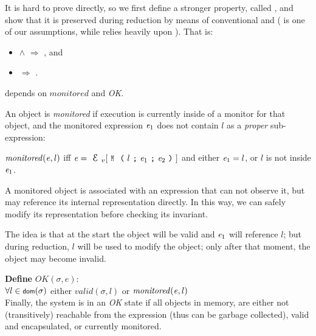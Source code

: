 It is hard to prove  directly,
so we first define a stronger property,
called , and
show that it is preserved during reduction by means of conventional
 and  ( is one of our assumptions,
while  relies heavily upon ).
That is:
\begin{itemize}
\item {} $\wedge$  $\Rightarrow$ , and
\item {} $\Rightarrow$ .
\end{itemize}


 depends on $\mathit{monitored}$ and \emph{OK}. 

An object is \emph{monitored} if execution
is currently inside of a monitor for that object, and
the monitored expression ${\mathit{e}}_1$ does not
contain $l$ as a \emph{proper} sub-expression:

\indent $\mathit{monitored}({\mathit{e}},l)$ iff
$\e=\ctx_v[\M{l}{\e_1}{\e_2}]$ and either ${\mathit{e}}_1=l$, or $l$ is not inside ${\mathit{e}}_1$.%

\noindent A monitored object is associated with an expression that can not observe it, but may
reference its internal representation directly.
In this way, we can safely modify its representation before checking its invariant.

The idea is that at the start the object will be valid and ${\mathit{e}}_1$ will reference $l$;
but during reduction, $l$ will be used to
modify the object; only after that moment, the object may become invalid.


\noindent\textbf{Define} $\mathit{OK}(\sigma,e)$:\\
\indent $\forall l\in\dom(\sigma)$
  either $\mathit{valid}(\sigma,l)$ or $\mathit{monitored}({\mathit{e}},l)$\\

\noindent Finally, the system is in an \emph{OK} state
if all objects in memory, are either
not (transitively) reachable from the expression (thus can be garbage collected),
valid and encapsulated,
or currently monitored.

